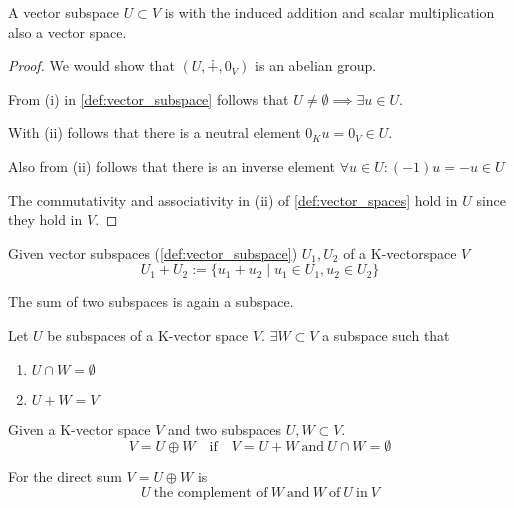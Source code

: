 \begin{theorem}[Subspace = Vector Space]\label{thm:subspace=vecspace}
   A vector subspace \(U \subset V\) is with the induced addition and scalar multiplication also a vector space.
\end{theorem}
\begin{proof}
   We would show that \((U, \dotplus, 0_V)\) is an abelian group.

   From (i) in \cref{def:vector_subspace} follows that \(U \neq \emptyset \implies \exists u \in U\).

   With (ii) follows that there is a neutral element \(0_K u = 0_V \in U\).

   Also from (ii) follows that there is an inverse element \(\forall u \in U: (-1)u = -u \in U\)

   The commutativity and associativity in (ii) of \cref{def:vector_spaces} hold in \(U\) since they hold in \(V\).
\end{proof}

\begin{definition}\label{def:subspace_sum}
   Given vector subspaces (\ref{def:vector_subspace}) \(U_1, U_2\) of a K-vectorspace \(V\)
   \[U_1 + U_2 := \{u_1 + u_2 \mid u_1 \in U_1, u_2 \in U_2\}\]
\end{definition}
\begin{remark}
   The sum of two subspaces is again a subspace.
\end{remark}

\begin{lemma}\label{lem:vectorspace_complement}
   Let \(U\) be subspaces of a K-vector space \(V\).
   \(\exists W \subset V\) a subspace such that
   \begin{enumerate}[label=\roman*, align=Center]
      \item \(U \cap W = \emptyset\)
      \item \(U + W = V\)
   \end{enumerate}
\end{lemma}

\begin{definition}\label{def:direct_sum}
   Given a K-vector space \(V\) and two subspaces \(U, W \subset V\).
   \[V = U \oplus W \quad\text{if}\quad V = U + W~\text{and}~U \cap W = \emptyset\]
\end{definition}

\begin{definition}\label{def:complement}
   For the direct sum \(V = U \oplus W\) is
   \[U~\text{the complement of}~W~\text{and}~W~\text{of}~U~\text{in}~V\]
\end{definition}

